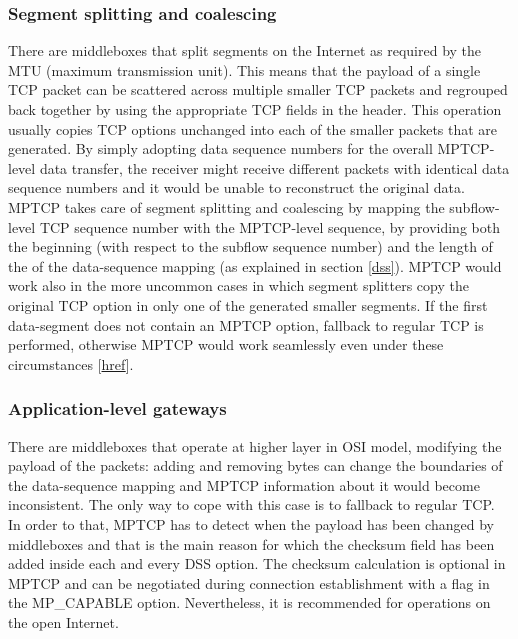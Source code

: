 \subsubsection{Segment splitting and coalescing}
There are middleboxes that split segments on the Internet as required by the MTU (maximum transmission unit). This means that the payload of a single TCP packet can be scattered across multiple smaller TCP packets and regrouped back together by using the appropriate TCP fields in the header. This operation usually copies TCP options unchanged into each of the smaller packets that are generated. By simply adopting data sequence numbers for the overall MPTCP-level data transfer, the receiver might receive different packets with identical data sequence numbers and it would be unable to reconstruct the original data. MPTCP takes care of segment splitting and coalescing by mapping the subflow-level TCP sequence number with the MPTCP-level sequence, by providing both the beginning (with respect to the subflow sequence number) and the length of the of the data-sequence mapping (as explained in section \ref{dss}).
MPTCP would work also in the more uncommon cases in which segment splitters copy the original TCP option in only one of the generated smaller segments. If the first data-segment does not contain an MPTCP option, fallback to regular TCP is performed, otherwise MPTCP would work seamlessly even under these circumstances [\href{http://conferences.sigcomm.org/co-next/2013/workshops/HotMiddlebox/program/p37.pdf}{href}].

\subsubsection{Application-level gateways}
There are middleboxes that operate at higher layer in OSI model, modifying the payload of the packets: adding and removing bytes can change the boundaries of the data-sequence mapping and MPTCP information about it would become inconsistent. The only way to cope with this case is to fallback to regular TCP. In order to that, MPTCP has to detect when the payload has been changed by middleboxes and that is the main reason for which the checksum field has been added inside each and every DSS option. The checksum calculation is optional in MPTCP and can be negotiated during connection establishment with a flag in the MP\_CAPABLE option. Nevertheless, it is recommended for operations on the open Internet.


